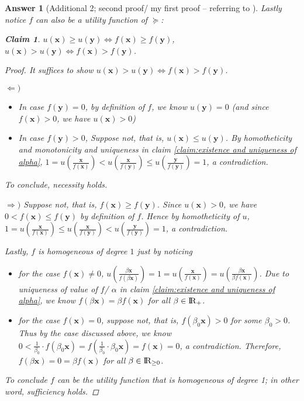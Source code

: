 \documentclass{article}
\newtheorem*{ans}{Answer}
\newtheorem{claim}{Claim}
\newcommand {\Reals}  {{\rm I \! R}}
\newcommand{\1}{{\bf 1}}
\newcommand{\0}{{\mathbf{0}}}
\newcommand{\x}{{\mathbf{x}}}
\newcommand{\y}{{\mathbf{y}}}
\newcommand{\<}{\langle}
\renewcommand{\>}{\rangle}
\begin{document}
\begin{ans}[Additional 2; second proof/ my first proof -- referring to \cite{jain2005market}]
	
Lastly notice $f$ can also be a utility function of $\succeq$:
\begin{mdframed}
		\begin{claim} $u(\x) \ge u(\y) \Leftrightarrow f(\x) \ge f(\y)$, $u(\x) > u(\y) \Leftrightarrow f(\x) > f(\y)$.
		\end{claim}
\end{mdframed}
\begin{proof}
	It suffices to show $u(\x) > u(\y) \Leftrightarrow f(\x) >  f(\y)$.
	
	$\Leftarrow)$ 
	\begin{itemize}
		\item In case $f(\y) = 0$, by definition of $f$, we know $u(\y) =0$ (and since $f(\x) >0$, we have $u(\x) >0$)
		\item In case $f(\y) > 0$, Suppose not, that is, $u(\x) \le u(\y)$. By homotheticity and monotonicity and uniqueness in claim \ref{claim:existence and uniqueness of alpha}, $ 1=  u\left(\frac{\x}{f(\x)} \right)  < u\left(\frac{\x}{f(\y)} \right) \le  u\left(\frac{\y}{f(\y)} \right) =1$, a contradiction.
	\end{itemize}
	 
	To conclude, necessity holds.
	
	$\Rightarrow)$ Suppose not, that is, $f(\x) \ge f(\y)$. Since $u(\x) >0$, we have $ 0 < f(\x) \le f(\y)$ by definition of $f$. Hence by homotheticity of $u$, $ 1  = u\left(\frac{\x}{f(\x)} \right) \le u\left(\frac{\x}{f(\y)} \right)  < u\left(\frac{\y}{f(\y)} \right) =1 $, a contradiction.
	
	Lastly, $f$ is homogeneous of degree $1$ just by noticing
\begin{itemize}
	\item for the case $f(\x) \ne 0$, $u\left( \frac{\beta \x}{f(\beta \x )} \right) =1 =  u \left( \frac{ \x}{  f( \x )} \right) =  u \left( \frac{\beta \x}{ \beta f( \x )} \right)  $. Due to uniqueness of value of $f$/ $\alpha$ in claim \ref{claim:existence and uniqueness of alpha}, we know $f(\beta \x ) = \beta f(\x)$ for all $\beta \in \Reals_+$.
	\item for the case $f(\x) = 0$, suppose not, that is, $f(\beta_0\x) >0$ for some $\beta_0 >0$. Thus by the case discussed above, we know $0 < \frac1{\beta_0} \cdot f\left( \beta_0\x\right) = f\left(\frac1{\beta_0} \cdot \beta_0\x\right) =  f(\x) = 0$, a contradiction. Therefore, $f(\beta\x)=0 = \beta f(\x)$ for all $\beta \in \Reals_{\ge 0}$.
\end{itemize}
	
	To conclude $f$ can be the utility function that is homogeneous of degree 1; in other word, sufficiency holds.
\end{proof}
\end{ans}
\end{document}
